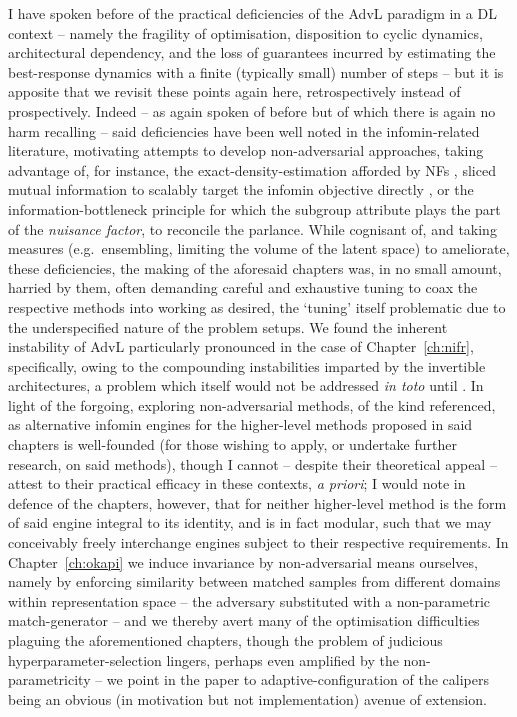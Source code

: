 %
I have spoken before of the practical deficiencies of the \ac{AdvL} paradigm in a \ac{DL} context
-- namely the fragility of optimisation, disposition to cyclic dynamics, architectural dependency,
and the loss of guarantees incurred by estimating the best-response dynamics with a finite
(typically small) number of steps -- but it is apposite that we revisit these points again here,
retrospectively instead of prospectively.
%
%
Indeed -- as again spoken of before but of which there is again no harm recalling -- said
deficiencies have been well noted in the infomin-related literature, motivating attempts to develop
non-adversarial approaches, taking advantage of, for instance, the exact-density-estimation
afforded by \acp{NF} \citep{balunovic2021fair}, sliced mutual information
\citep{goldfeld2021sliced} to scalably target the infomin objective directly
\citep{chen2022scalable}, or the information-bottleneck principle \citep{tishby2015deep,
moyer2018invariant} for which the subgroup attribute plays the part of the \emph{nuisance factor},
to reconcile the parlance.
%
While cognisant of, and taking measures (e.g.\ ensembling, limiting the volume of the latent space)
to ameliorate, these deficiencies, the making of the aforesaid chapters was, in no small amount,
harried by them, often demanding careful and exhaustive tuning to coax the respective methods into
working as desired, the `tuning' itself problematic due to the underspecified nature of the problem
setups.
%
We found the inherent instability of \ac{AdvL} particularly pronounced in the case of
Chapter~\ref{ch:nifr}, specifically, owing to the compounding instabilities imparted by the
invertible architectures, a problem which itself would not be addressed \emph{in toto} until
\cite{behrmann2021understanding}.
%
In light of the forgoing, exploring non-adversarial methods, of the kind referenced, as alternative
infomin engines for the higher-level methods proposed in said chapters is well-founded (for those
wishing to apply, or undertake further research, on said methods), though I cannot -- despite their
theoretical appeal -- attest to their practical efficacy in these contexts, \emph{a priori}; I
would note in defence of the chapters, however, that for neither higher-level method is the form of
said engine integral to its identity, and is in fact modular, such that we may conceivably freely
interchange engines subject to their respective requirements.
%
In Chapter~\ref{ch:okapi} we induce invariance by non-adversarial means ourselves, namely by
enforcing similarity between matched samples from different domains within representation space --
the adversary substituted with a non-parametric match-generator -- and we thereby avert many of the
optimisation difficulties plaguing the aforementioned chapters, though the problem of judicious
hyperparameter-selection lingers, perhaps even amplified by the non-parametricity -- we point in
the paper to adaptive-configuration of the calipers being an obvious (in motivation but not
implementation) avenue of extension.
%

